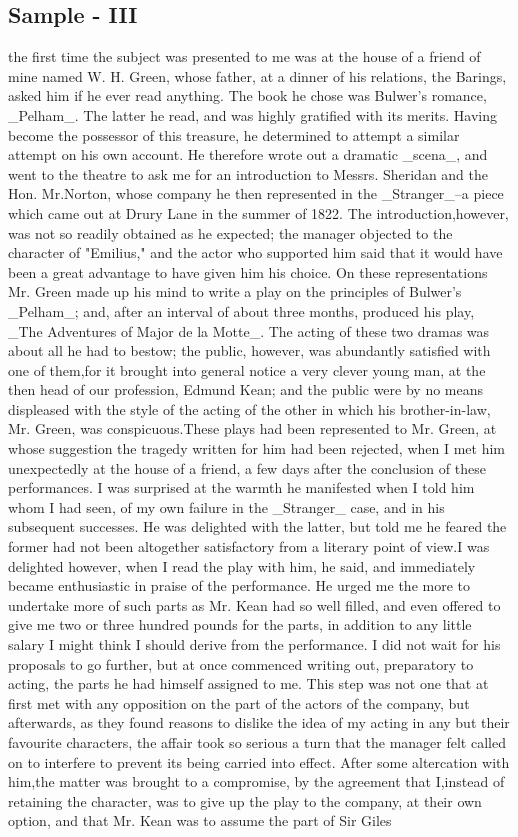 \documentclass[a4paper]{article}
\begin{document}
\subsection{Sample - III}
the first time the subject was presented to me was at the house of a friend of mine named W. H. Green, whose father, at a dinner of his relations, the Barings, asked him if he ever read anything. The book he chose was Bulwer's romance, _Pelham_. The latter he read, and was highly gratified with its merits. Having become the possessor of this treasure, he determined to attempt a similar attempt on his own account. He therefore wrote out a dramatic _scena_, and went to the theatre to ask me for an introduction to Messrs. Sheridan and the Hon. Mr.Norton, whose company he then represented in the _Stranger_--a piece which came out at Drury Lane in the summer of 1822. The introduction,however, was not so readily obtained as he expected; the manager objected to the character of "Emilius," and the actor who supported him said that it would have been a great advantage to have given him his choice. On these representations Mr. Green made up his mind to write a play on the principles of Bulwer's _Pelham_; and, after an interval of about three months, produced his play, _The Adventures of Major de la Motte_. The acting of these two dramas was about all he had to bestow; the public, however, was abundantly satisfied with one of them,for it brought into general notice a very clever young man, at the then head of our profession, Edmund Kean; and the public were by no means displeased with the style of the acting of the other in which his brother-in-law, Mr. Green, was conspicuous.These plays had been represented to Mr. Green, at whose suggestion the tragedy written for him had been rejected, when I met him unexpectedly at the house of a friend, a few days after the conclusion of these performances. I was surprised at the warmth he manifested when I told him whom I had seen, of my own failure in the _Stranger_ case, and in his subsequent successes. He was delighted with the latter, but told me he feared the former had not been altogether satisfactory from a literary point of view.I was delighted however, when I read the play with him, he said, and immediately became enthusiastic in praise of the performance. He urged me the more to undertake more of such parts as Mr. Kean had so well filled, and even offered to give me two or three hundred pounds for the parts, in addition to any little salary I might think I should derive from the performance. I did not wait for his proposals to go further, but at once commenced writing out, preparatory to acting, the parts he had himself assigned to me. This step was not one that at first met with any opposition on the part of the actors of the company, but afterwards, as they found reasons to dislike the idea of my acting in any but their favourite characters, the affair took so serious a turn that the manager felt called on to interfere to prevent its being carried into effect. After some altercation with him,the matter was brought to a compromise, by the agreement that I,instead of retaining the character, was to give up the play to the company, at their own option, and that Mr. Kean was to assume the part of Sir Giles 
\end{document}
